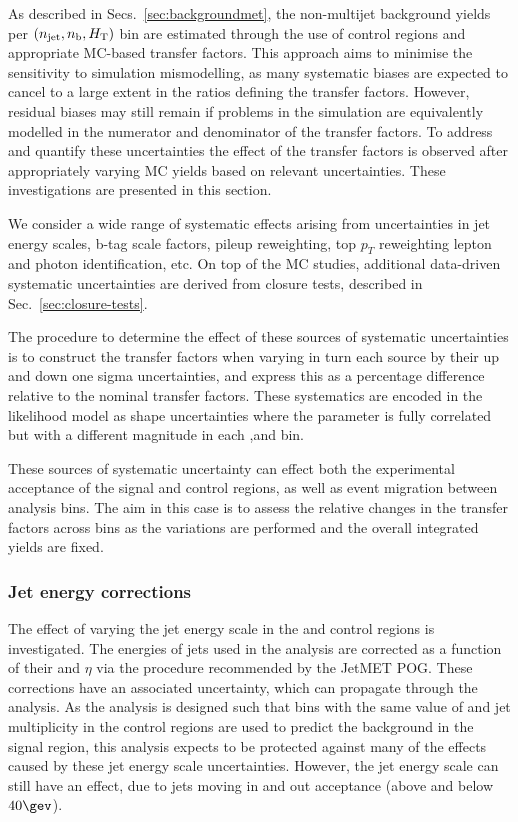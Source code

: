 As described in Secs.~\ref{sec:backgroundmet}, the non-multijet background yields
per $(\njet,\nb,\scalht)$ bin are estimated through the use of control
regions and appropriate MC-based transfer factors. This approach aims
to minimise the sensitivity to simulation mismodelling, as many
systematic biases are expected to cancel to a large extent in the
ratios defining the transfer factors. However, residual biases may
still remain if problems in the simulation are equivalently modelled
in the numerator and denominator of the transfer factors. To address
and quantify these uncertainties the effect of the transfer factors is
observed after appropriately varying MC yields based on relevant
uncertainties. These investigations are presented in this section. 

We consider a wide range of systematic effects arising from
uncertainties in jet energy scales, b-tag scale factors, pileup
reweighting, top $p_T$ reweighting lepton and photon identification, etc. 
On top of the MC studies, additional data-driven systematic 
uncertainties are derived from closure tests, described in
Sec.~\ref{sec:closure-tests}.

The procedure to determine the effect of these sources of systematic
uncertainties is to construct the transfer factors when varying in
turn each source by their up and down one sigma uncertainties, and
express this as a percentage difference relative to the nominal
transfer factors. These systematics are encoded in the likelihood
model as shape uncertainties where the parameter is fully correlated
but with a different magnitude in each \njet,\nb and \scalht bin.

These sources of systematic uncertainty can effect both the
experimental acceptance of the signal and control regions, as well as
event migration between analysis bins. 
The aim in this case is to assess the relative changes in the transfer
factors across bins as the variations are performed and the overall
integrated yields are fixed.

\subsubsection{Jet energy corrections}

The effect of varying the jet energy scale in
the \mj and \mmj control regions is investigated.  The energies of
jets used in the analysis are corrected as a function of their \pt and
$\eta$ via the procedure recommended by the JetMET POG. These
corrections have an associated uncertainty, which can propagate
through the analysis.  As the analysis is designed such that bins with
the same value of \scalht and jet multiplicity in the control regions
are used to predict the background in the signal region, this analysis
expects to be protected against many of the effects caused by these jet energy
scale uncertainties. However, the jet energy scale can still have an
effect, due to jets moving in and out acceptance (above and below
$40\gev$).

